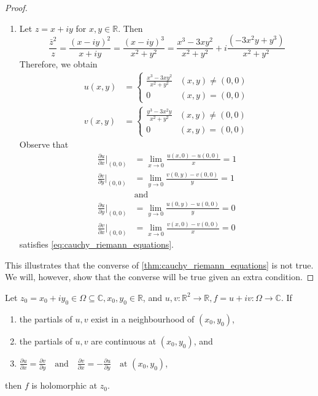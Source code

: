 \documentclass[notoc,notitlepage]{tufte-book}
\begin{document}
\begin{eg}
\begin{proof}
\begin{enumerate}
			\item Let $z = x + iy$ for $x, y \in \mathbb{R}$. Then
			\begin{equation*}
				\frac{\bar{z}^2}{z} = \frac{(x - iy)^2}{x + iy} = \frac{(x - iy)^3}{x^2 + y^2} = \frac{x^3 - 3xy^2}{x^2 + y^2} + i \frac{(-3x^2y + y^3)}{x^2 + y^2}
			\end{equation*}
			Therefore, we obtain
			\begin{align*}
				u(x, y) &= \begin{cases}
					\frac{x^3 - 3xy^2}{x^2 + y^2} & (x, y) \neq (0, 0) \\
					0	& (x, y) = (0, 0)
				\end{cases} \\
				v(x, y) &= \begin{cases}
					\frac{y^3 - 3x^2y}{x^2 + y^2} & (x, y) \neq (0, 0) \\
					0	& (x, y) = (0, 0)
				\end{cases}
			\end{align*}
			Observe that
			\begin{align*}
				\frac{\partial u}{\partial x} \Bigr|_{(0, 0)}
					&= \lim_{x \to 0} \frac{u(x, 0) - u(0, 0)}{x} = 1 \\
				\frac{\partial v}{\partial y} \Bigr|_{(0, 0)}
					&= \lim_{y \to 0} \frac{v(0, y) - v(0, 0)}{y} = 1 \\
					&\text{and} \\
				\frac{\partial u}{\partial y} \Bigr|_{(0, 0)}
					&= \lim_{y \to 0} \frac{u(0, y) - u(0, 0)}{y} = 0 \\
				\frac{\partial v}{\partial x} \Bigr|_{(0, 0)}
					&= \lim_{x \to 0} \frac{v(x, 0) - v(0, 0)}{x} = 0
			\end{align*}
			satisfies \cref{eq:cauchy_riemann_equations}.
		\end{enumerate}
		This illustrates that the converse of \cref{thm:cauchy_riemann_equations} is not true. We will, however, show that the converse will be true given an extra condition.
	\end{proof}
\end{eg}

\begin{thm}\label{thm:conditional_converse_of_cre}
	Let $z_0 = x_0 + iy_0 \in \Omega \subseteq \mathbb{C}, x_0, y_0 \in \mathbb{R}$, and $u, v : \mathbb{R}^2 \to \mathbb{R}, f = u + iv : \Omega \to \mathbb{C}$. If
	\begin{enumerate}
		\item the partials of $u, v$ exist in a neighbourhood of $(x_0, y_0)$,
		\item the partials of $u, v$ are continuous at $(x_0, y_0)$, and
		\item $\frac{\partial u}{\partial x} = \frac{\partial v}{\partial y} \quad \text{and} \quad \frac{\partial v}{\partial x} = - \frac{\partial u}{\partial y} \quad \text{at } (x_0, y_0)$,
	\end{enumerate}
	then $f$ is holomorphic at $z_0$.
\end{thm}
\end{document}
